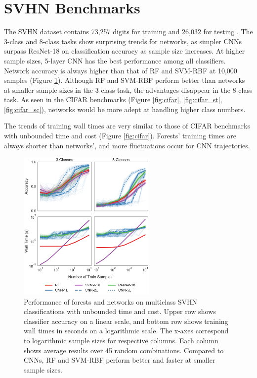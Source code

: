 \section{SVHN Benchmarks}
\label{app:svhn}
The SVHN dataset contains 73,257 digits for training and 26,032 for testing \citep{svhn}. The 3-class and 8-class tasks show surprising trends for networks, as simpler CNNs surpass ResNet-18 on classification accuracy as sample size increases. At higher sample sizes, 5-layer CNN has the best performance among all classifiers. Network accuracy is always higher than that of RF and SVM-RBF at 10,000 samples (Figure \ref{fig:svhn}). Although RF and SVM-RBF perform better than networks at smaller sample sizes in the 3-class task, the advantages disappear in the 8-class task. As seen in the CIFAR benchmarks (Figure \ref{fig:cifar}, \ref{fig:cifar_st}, \ref{fig:cifar_sc}), networks would be more adept at handling higher class numbers.

The trends of training wall times are very similar to those of CIFAR benchmarks with unbounded time and cost (Figure \ref{fig:cifar}). Forests' training times are always shorter than networks', and more fluctuations occur for CNN trajectories.

\begin{figure}[!htb]
\centering
\includegraphics[width=0.6\textwidth]{figures/svhn.pdf}
  \caption{Performance of forests and networks on multiclass SVHN classifications with unbounded time and cost.
  Upper row shows classifier accuracy on a linear scale, and bottom row shows training wall times in seconds on a logarithmic scale. The x-axes correspond to logarithmic sample sizes for respective columns. Each column shows average results over 45 random combinations.
  Compared to CNNs, RF and SVM-RBF perform better and faster at smaller sample sizes.
  }
\label{fig:svhn}
\end{figure}
\clearpage

